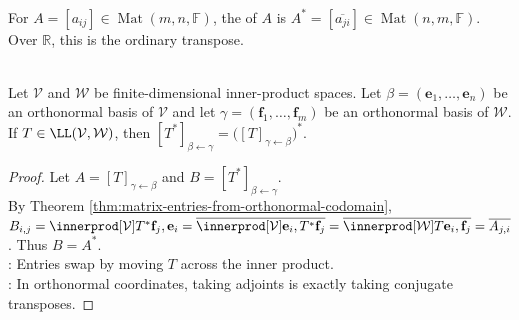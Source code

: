 \begin{definition} \label{def:conjugate-transpose} \\
For $A=[a_{ij}]\in\operatorname{Mat}(m,n,\mathbb{F})$, the  of $A$ is $A^*=[\overline{a_{ji}}]\in\operatorname{Mat}(n,m,\mathbb{F})$.\\
Over $\mathbb{R}$, this is the ordinary transpose.
\end{definition}

\begin{theorem} \label{thm:matrix-of-adjoint-is-conjugate-transpose} \\
Let $\mathcal{V}$ and $\mathcal{W}$ be finite-dimensional inner-product spaces. Let $\beta=(\mathbf{e}_1,\ldots,\mathbf{e}_n)$ be an orthonormal basis of $\mathcal{V}$ and let $\gamma=(\mathbf{f}_1,\ldots,\mathbf{f}_m)$ be an orthonormal basis of $\mathcal{W}$. If $T\in\LL(\mathcal{V},\mathcal{W})$, then $[T^*]_{\beta\leftarrow\gamma} =\bigl([T]_{\gamma\leftarrow\beta}\bigr)^*$.
\begin{proof}
Let $A=[T]_{\gamma\leftarrow\beta}$ and $B=[T^*]_{\beta\leftarrow\gamma}$.\\
By Theorem \ref{thm:matrix-entries-from-orthonormal-codomain}, $B_{i,j}=\innerprod[\mathcal{V}]{T^*\mathbf{f}_j,\mathbf{e}_i} =\overline{\innerprod[\mathcal{V}]{\mathbf{e}_i,T^*\mathbf{f}_j}} =\overline{\innerprod[\mathcal{W}]{T\mathbf{e}_i,\mathbf{f}_j}} =\overline{A_{j,i}}$. Thus $B=A^*$.\\
: Entries swap by moving $T$ across the inner product.\\
: In orthonormal coordinates, taking adjoints is exactly taking conjugate transposes.
\end{proof}
\end{theorem}

